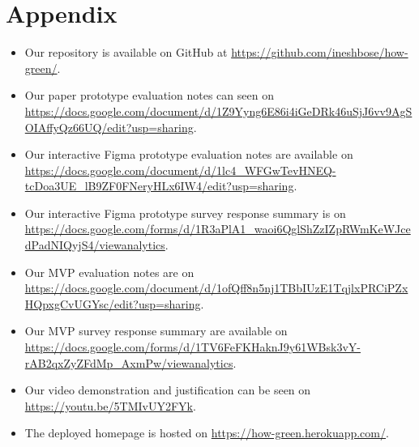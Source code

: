 \documentclass[a4,10pt,twocolumn]{article}
\begin{document}

\printbibliography

\section*{Appendix}

\begin{itemize}
    \item Our repository is available on GitHub at \url{https://github.com/ineshbose/how-green/}.
    \item Our paper prototype evaluation notes can seen on \url{https://docs.google.com/document/d/1Z9Yyng6E86i4iGeDRk46uSjJ6vv9AgSOIAffyQz66UQ/edit?usp=sharing}.
    \item Our interactive Figma prototype evaluation notes are available on \url{https://docs.google.com/document/d/1lc4_WFGwTevHNEQ-tcDoa3UE_lB9ZF0FNeryHLx6IW4/edit?usp=sharing}.
    \item Our interactive Figma prototype survey response summary is on \url{https://docs.google.com/forms/d/1R3aPlA1_waoi6QglShZzIZpRWmKeWJcedPadNIQyjS4/viewanalytics}.
    \item Our MVP evaluation notes are on \url{https://docs.google.com/document/d/1ofQff8n5nj1TBbIUzE1TqjlxPRCiPZxHQpxgCvUGYsc/edit?usp=sharing}.
    \item Our MVP survey response summary are available on \url{https://docs.google.com/forms/d/1TV6FeFKHaknJ9y61WBsk3vY-rAB2qxZyZFdMp_AxmPw/viewanalytics}.
    \item Our video demonstration and justification can be seen on \url{https://youtu.be/5TMIvUY2FYk}.
    \item The deployed homepage is hosted on \url{https://how-green.herokuapp.com/}.
\end{itemize}
\end{document}
